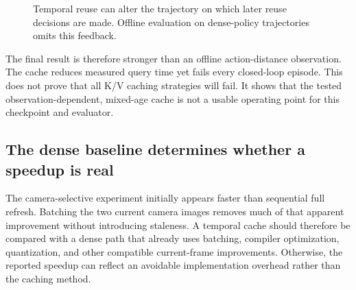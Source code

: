 \documentclass[journal]{IEEEtran}
\begin{document}
\begin{figure}[t]
\centering
{}
\caption{Temporal reuse can alter the trajectory on which later reuse decisions are made. Offline evaluation on dense-policy trajectories omits this feedback.}
\label{fig:feedback}
\end{figure}

The final result is therefore stronger than an offline action-distance observation. The cache reduces measured query time yet fails every closed-loop episode. This does not prove that all K/V caching strategies will fail. It shows that the tested observation-dependent, mixed-age cache is not a usable operating point for this checkpoint and evaluator.

\subsection{The dense baseline determines whether a speedup is real}
The camera-selective experiment initially appears faster than sequential full refresh. Batching the two current camera images removes much of that apparent improvement without introducing staleness. A temporal cache should therefore be compared with a dense path that already uses batching, compiler optimization, quantization, and other compatible current-frame improvements. Otherwise, the reported speedup can reflect an avoidable implementation overhead rather than the caching method.
\end{document}
